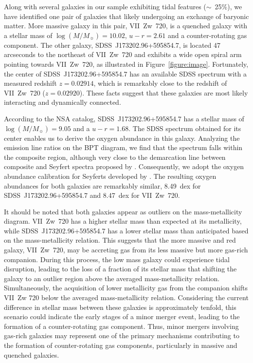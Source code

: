 \documentclass[12pt,preprint]{aa}
\begin{document}
Along with several galaxies in our sample exhibiting tidal features ($\sim$~25\%), we have identified one pair of galaxies that likely undergoing an exchange of baryonic matter. More massive galaxy in this pair, VII~Zw~720, is a quenched galaxy with a stellar mass of $\log(M/M_\sun) = 10.02$, $u-r = 2.61$ and a counter-rotating gas component. The other galaxy, SDSS~J173202.96+595854.7, is located 47 arcseconds to the northeast of VII~Zw~720 and exhibits a wide open spiral arm pointing towards VII~Zw~720, as illustrated in Figure~\ref{figure:image}. Fortunately, the center of SDSS~J173202.96+595854.7 has an available SDSS spectrum with a measured redshift $z = 0.02914$, which is remarkably close to the redshift of VII~Zw~720 ($z = 0.02920$). These facts suggest that these galaxies are most likely interacting and dynamically connected.

According to the NSA catalog, SDSS~J173202.96+595854.7 has a stellar mass of $\log(M/M_\sun) = 9.05$ and a $u-r = 1.68$. The SDSS spectrum obtained for its center enables us to derive the oxygen abundance in this galaxy. Analyzing the emission line ratios on the BPT diagram, we find that the spectrum falls within the composite region, although very close to the demarcation line between composite and Seyfert spectra proposed by \citet{Kewley2001}. Consequently, we adopt the oxygen abundance calibration for Seyferts developed by \citet{Dors2021}. The resulting oxygen abundances for both galaxies are remarkably similar, 8.49~dex for SDSS~J173202.96+595854.7 and 8.47~dex for VII~Zw~720. 

It should be noted that both galaxies appear as outliers on the mass-metallicity diagram. VII~Zw~720 has a higher stellar mass than expected at its metallicity, while SDSS~J173202.96+595854.7 has a lower stellar mass than anticipated based on the mass-metallicity relation. This suggests that the more massive and red galaxy, VII~Zw~720, may be accreting gas from its less massive but more gas-rich companion. During this process, the low mass galaxy could experience tidal disruption, leading to the loss of a fraction of its stellar mass that shifting the galaxy to an outlier region above the averaged mass-metallicity relation. Simultaneously, the acquisition of lower metallicity gas from the companion shifts VII~Zw 720 below the averaged mass-metallicity relation. Considering the current difference in stellar mass between these galaxies is approximately tenfold, this scenario could indicate the early stages of a minor merger event, leading to the formation of a counter-rotating gas component. Thus, minor mergers involving gas-rich galaxies may represent one of the primary mechanisms contributing to the formation of counter-rotating gas components, particularly in massive and quenched galaxies.
\end{document}
